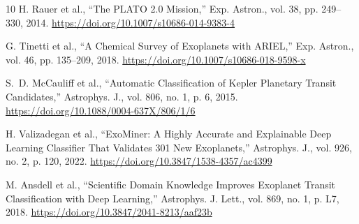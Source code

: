 \documentclass[preprint,11pt,times]{elsarticle}
\begin{document}
\begin{thebibliography}{10}
H. Rauer et al., ``The PLATO 2.0 Mission,'' Exp. Astron., vol. 38, pp. 249--330, 2014. \url{https://doi.org/10.1007/s10686-014-9383-4}

G. Tinetti et al., ``A Chemical Survey of Exoplanets with ARIEL,'' Exp. Astron., vol. 46, pp. 135--209, 2018. \url{https://doi.org/10.1007/s10686-018-9598-x}

S.~D. McCauliff et al., ``Automatic Classification of Kepler Planetary Transit Candidates,'' Astrophys. J., vol. 806, no. 1, p. 6, 2015. \url{https://doi.org/10.1088/0004-637X/806/1/6}

H. Valizadegan et al., ``ExoMiner: A Highly Accurate and Explainable Deep Learning Classifier That Validates 301 New Exoplanets,'' Astrophys. J., vol. 926, no. 2, p. 120, 2022. \url{https://doi.org/10.3847/1538-4357/ac4399}

M. Ansdell et al., ``Scientific Domain Knowledge Improves Exoplanet Transit Classification with Deep Learning,'' Astrophys. J. Lett., vol. 869, no. 1, p. L7, 2018. \url{https://doi.org/10.3847/2041-8213/aaf23b}


\end{thebibliography}
\end{document}
